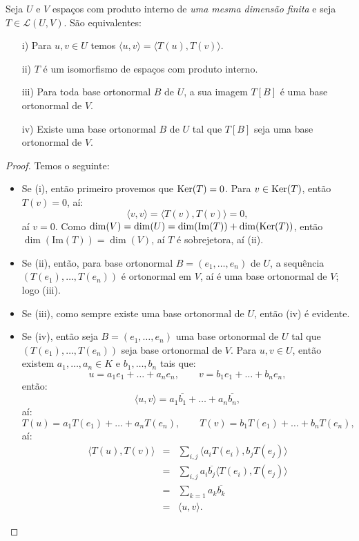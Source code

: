 \documentclass[11pt,twoside,a4paper]{book}
\begin{document}
\begin{teorema}\label{unitario}
Seja $U$ e $V$ espaços com produto interno de \emph{uma mesma dimensão finita} e seja $T\in\mathcal{L}(U,V)$. São equivalentes:
\begin{itemize}
\item[i)] Para $u,v\in U$ temos $\langle u,v\rangle=\langle T(u),T(v)\rangle$.
\item[ii)] $T$ é um isomorfismo de espaços com produto interno.
\item[iii)] Para toda base ortonormal $B$ de $U$, a sua imagem $T[B]$ é uma base ortonormal de $V$. 
\item[iv)] Existe uma base ortonormal $B$ de $U$ tal que $T[B]$ seja uma base ortonormal de $V$.
\end{itemize}
\end{teorema}
\begin{proof}
Temos o seguinte:
\begin{itemize}
\item Se (i), então primeiro provemos que $\operatorname{Ker}(T)=0$. Para $v\in \operatorname{Ker}(T)$, então $T(v)=0$, aí:
\[
\langle v,v\rangle=\langle T(v),T(v)\rangle=0,
\]
aí $v=0$. Como $\dim(V)=\dim(U)=\dim(\mathrm{Im}(T))+\dim(\operatorname{Ker}(T))$, então $\dim(\mathrm{Im}(T))=\dim(V)$, aí $T$ é sobrejetora, aí (ii).
\item Se (ii), então, para base ortonormal $B=(e_1,\dots,e_n)$ de $U$, a sequência $(T(e_1),\dots,T(e_n))$ é ortonormal em $V$, aí é uma base ortonormal de $V$; logo (iii).
\item Se (iii), como sempre existe uma base ortonormal de $U$, então (iv) é evidente.
\item Se (iv), então seja $B=(e_1,\dots,e_n)$ uma base ortonormal de $U$ tal que $(T(e_1),\dots,T(e_n))$ seja base ortonormal de $V$. Para $u,v\in U$, então existem $a_1,\dots,a_n\in K$ e $b_1,\dots,b_n$ tais que:
\[
u=a_1e_1+\dots+a_ne_n,\quad\quad v=b_1e_1+\dots+b_ne_n,
\]
então:
\[
\langle u,v\rangle=a_1\overline{b_1}+\dots+a_n\overline{b_n},
\]
aí:
\[
T(u)=a_1T(e_1)+\dots+a_nT(e_n),\quad\quad T(v)=b_1T(e_1)+\dots+b_nT(e_n),
\]
aí:
\[
\begin{array}{rcl}
\langle T(u),T(v)\rangle&=&\sum_{i,j}\langle a_iT(e_i),b_jT(e_j)\rangle\\
&=&\sum_{i,j}a_i\overline{b_j}\langle T(e_i),T(e_j)\rangle\\
&=&\sum_{k=1}a_k\overline{b_k}\\
&=&\langle u,v\rangle.
\end{array}
\]
\end{itemize}
\end{proof}
\end{document}
